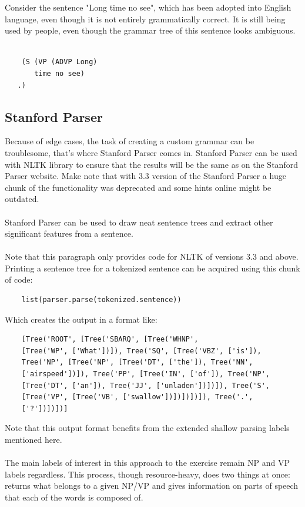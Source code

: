 \documentclass{article}
\begin{document}
Consider the sentence "Long time no see", which has been adopted into English language, even though it is not entirely grammatically correct. It is still being used by people, even though the grammar tree of this sentence looks ambiguous. \\ \\
\begin{verbatim}
    (S (VP (ADVP Long)
       time no see)
   .)
\end{verbatim}
\newpage

\subsection{Stanford Parser}
Because of edge cases, the task of creating a custom grammar can be troublesome, that's where Stanford Parser comes in. Stanford Parser can be used with NLTK library to ensure that the results will be the same as on the Stanford Parser website.\cite{Stanford Parser demo} Make note that with 3.3 version of the Stanford Parser a huge chunk of the functionality was deprecated and some hints online might be outdated. \\ \\
Stanford Parser can be used to draw neat sentence trees and extract other significant features from a sentence. \\ \\
Note that this paragraph only provides code for NLTK of versions 3.3 and above\cite{New NLTK Tokenizer}. Printing a sentence tree for a tokenized sentence can be acquired using this chunk of code:
\begin{verbatim}
    list(parser.parse(tokenized.sentence))
\end{verbatim}
Which creates the output in a format like:
\begin{verbatim}
    [Tree('ROOT', [Tree('SBARQ', [Tree('WHNP', 
    [Tree('WP', ['What'])]), Tree('SQ', [Tree('VBZ', ['is']), 
    Tree('NP', [Tree('NP', [Tree('DT', ['the']), Tree('NN', 
    ['airspeed'])]), Tree('PP', [Tree('IN', ['of']), Tree('NP',
    [Tree('DT', ['an']), Tree('JJ', ['unladen'])])]), Tree('S',
    [Tree('VP', [Tree('VB', ['swallow'])])])])]), Tree('.', 
    ['?'])])])]
\end{verbatim}
Note that this output format benefits from the extended shallow parsing labels mentioned here\cite{More labels for Stanford Parser}. \\ \\
The main labels of interest in this approach to the exercise remain NP and VP labels regardless. This process, though resource-heavy, does two things at once: returns what belongs to a given NP/VP and gives information on parts of speech that each of the words is composed of.
\end{document}
